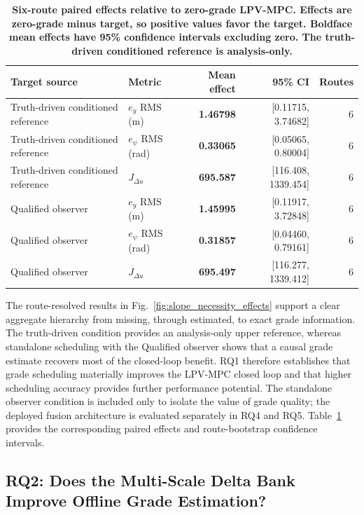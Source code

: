 \documentclass{ieeeaccess}
\begin{document}
\begin{table}[!t]
\centering
\caption{\textbf{Six-route paired effects relative to zero-grade LPV-MPC. Effects are zero-grade minus target, so positive values favor the target. Boldface mean effects have 95\% confidence intervals excluding zero. The truth-driven conditioned reference is analysis-only.}}
\label{tab:slope_necessity_effects}
\setlength{\tabcolsep}{3pt}
\begin{tabular}{|l|l|r|r|r|}
\hline
Target source & Metric & Mean effect & 95\% CI & Routes \\
\hline
Truth-driven conditioned reference & $e_y$ RMS (m) & \textbf{1.46798} & [0.11715, 3.74682] & 6 \\
Truth-driven conditioned reference & $e_\psi$ RMS (rad) & \textbf{0.33065} & [0.05065, 0.80004] & 6 \\
Truth-driven conditioned reference & $J_{\Delta u}$ & \textbf{695.587} & [116.408, 1339.454] & 6 \\
Qualified observer & $e_y$ RMS (m) & \textbf{1.45995} & [0.11917, 3.72848] & 6 \\
Qualified observer & $e_\psi$ RMS (rad) & \textbf{0.31857} & [0.04460, 0.79161] & 6 \\
Qualified observer & $J_{\Delta u}$ & \textbf{695.497} & [116.277, 1339.412] & 6 \\
\hline
\end{tabular}
\end{table}

The route-resolved results in Fig.~\ref{fig:slope_necessity_effects} support a clear aggregate hierarchy from missing, through estimated, to exact grade information. The truth-driven condition provides an analysis-only upper reference, whereas standalone scheduling with the Qualified observer shows that a causal grade estimate recovers most of the closed-loop benefit. RQ1 therefore establishes that grade scheduling materially improves the LPV-MPC closed loop and that higher scheduling accuracy provides further performance potential. The standalone observer condition is included only to isolate the value of grade quality; the deployed fusion architecture is evaluated separately in RQ4 and RQ5. Table~\ref{tab:slope_necessity_effects} provides the corresponding paired effects and route-bootstrap confidence intervals.

\subsection{RQ2: Does the Multi-Scale Delta Bank Improve Offline Grade Estimation?}
\end{document}

